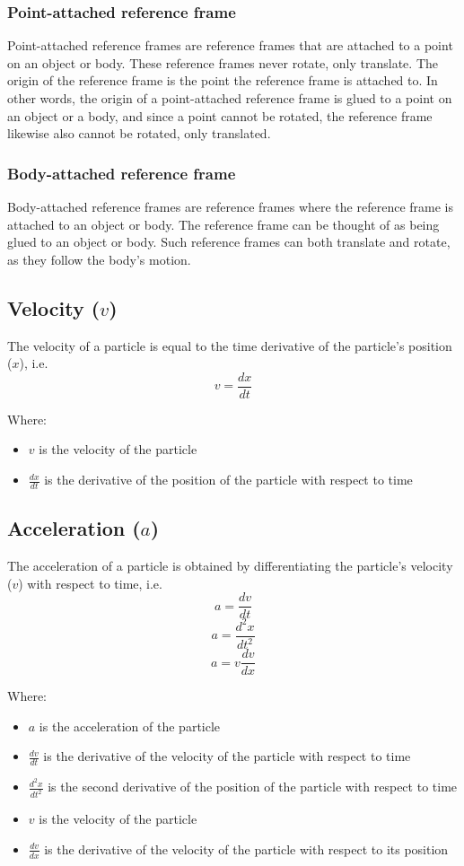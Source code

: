 \documentclass[11pt]{article}
\begin{document}
\subsubsection{Point-attached reference frame}
\label{sec:org64cca16}
Point-attached reference frames are reference frames that are attached to a point on an object or body. These reference frames never rotate, only translate. The origin of the reference frame is the point the reference frame is attached to. In other words, the origin of a point-attached reference frame is glued to a point on an object or a body, and since a point cannot be rotated, the reference frame likewise also cannot be rotated, only translated.

\subsubsection{Body-attached reference frame}
\label{sec:org211eec8}
Body-attached reference frames are reference frames where the reference frame is attached to an object or body. The reference frame can be thought of as being glued to an object or body. Such reference frames can both translate and rotate, as they follow the body's motion.

\subsection{Velocity (\(v\))}
\label{sec:org1baa9a5}
The velocity of a particle is equal to the time derivative of the particle's position (\(x\)), i.e.
\[v = \frac{dx}{dt}\]

Where:
\begin{itemize}
\item \(v\) is the velocity of the particle
\item \(\frac{dx}{dt}\) is the derivative of the position of the particle with respect to time
\end{itemize}

\subsection{Acceleration (\(a\))}
\label{sec:org4ccc392}
The acceleration of a particle is obtained by differentiating the particle's velocity (\(v\)) with respect to time, i.e.
\[a = \frac{dv}{dt}\]
\[a = \frac{d^2x}{dt^2}\]
\[a = v \frac{dv}{dx}\]

Where:
\begin{itemize}
\item \(a\) is the acceleration of the particle
\item \(\frac{dv}{dt}\) is the derivative of the velocity of the particle with respect to time
\item \(\frac{d^2x}{dt^2}\) is the second derivative of the position of the particle with respect to time
\item \(v\) is the velocity of the particle
\item \(\frac{dv}{dx}\) is the derivative of the velocity of the particle with respect to its position
\end{itemize}
\end{document}
